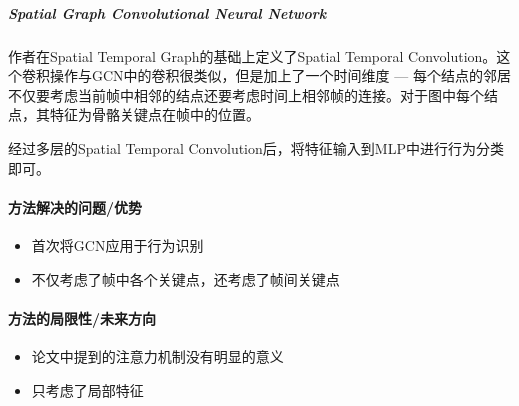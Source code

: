 \subparagraph{Spatial Graph Convolutional Neural Network}
作者在Spatial Temporal Graph的基础上定义了Spatial Temporal Convolution。这个卷积操作与GCN中的卷积很类似，但是加上了一个时间维度 --- 每个结点的邻居不仅要考虑当前帧中相邻的结点还要考虑时间上相邻帧的连接。对于图中每个结点，其特征为骨骼关键点在帧中的位置。

经过多层的Spatial Temporal Convolution后，将特征输入到MLP中进行行为分类即可。

\paragraph{方法解决的问题/优势}

\begin{itemize}

	\item 首次将GCN应用于行为识别
	\item 不仅考虑了帧中各个关键点，还考虑了帧间关键点

\end{itemize}

\paragraph{方法的局限性/未来方向}

\begin{itemize}

	\item 论文中提到的注意力机制没有明显的意义
	\item 只考虑了局部特征

\end{itemize}



